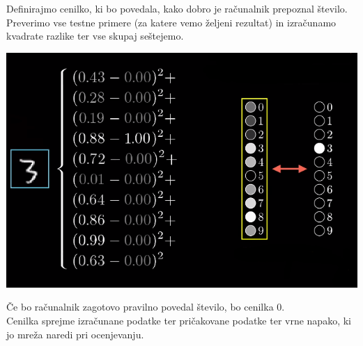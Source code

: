 \documentclass{beamer}
\begin{document}
\begin{frame}{}
Definirajmo cenilko, ki bo povedala, kako dobro je računalnik prepoznal število.\\
\smallskip
Preverimo vse testne primere (za katere vemo željeni rezultat) in izračunamo kvadrate razlike ter vse skupaj seštejemo.
\smallskip
\begin{center}
\includegraphics[scale = 0.35]{photo/2foto3} \\
\end{center}
\smallskip
Če bo računalnik zagotovo pravilno povedal število, bo cenilka 0. \\
\smallskip
Cenilka sprejme izračunane podatke ter pričakovane podatke ter vrne napako, ki jo mreža naredi pri ocenjevanju.
\end{frame}
 
\end{document}
